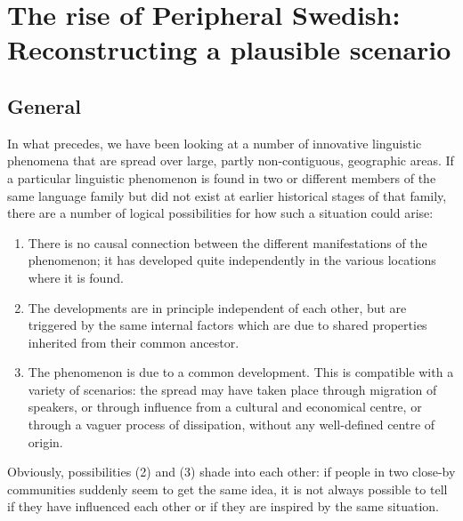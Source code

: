 
\chapter{The rise of Peripheral Swedish: Reconstructing a plausible scenario}
\section{General}
\label{bkm:Ref154567423}
In what precedes, we have been looking at a number of innovative linguistic phenomena that are spread over large, partly non-contiguous, geographic areas. If a particular linguistic phenomenon is found in two or different members of the same language family but did not exist at earlier historical stages of that family, there are a number of logical possibilities for how such a situation could arise:  


\begin{enumerate}
\item  
There is no causal connection between the different manifestations of the phenomenon; it has developed quite independently in the various locations where it is found. 
  
\item  
The developments are in principle independent of each other, but are triggered by the same internal factors which are due to shared properties inherited from their common ancestor. 
 
\item  
The phenomenon is due to a common development. This is compatible with a variety of scenarios: the spread may have taken place through migration of speakers, or through influence from a cultural and economical centre, or through a vaguer process of dissipation, without any well-defined centre of origin. 
\end{enumerate}



Obviously, possibilities (2) and (3) shade into each other: if people in two close-by communities suddenly seem to get the same idea, it is not always possible to tell if they have influenced each other or if they are inspired by the same situation. 

